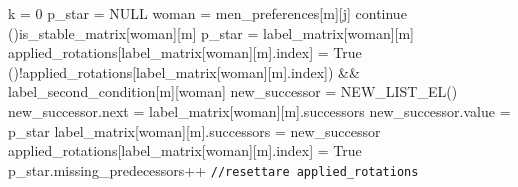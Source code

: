 \documentclass[12pt]{article}
\begin{document}
    \begin{algorithm}
        \scriptsize
        \DontPrintSemicolon
         {
		k = 0\;
            p\_star = NULL\;
		 {
			woman = men\_preferences[m][j]\:
			 {
                    continue\;
                }
			\If (){is\_stable\_matrix[woman][m]}{
                    p\_star = label\_matrix[woman][m]\;
                    applied\_rotations[label\_matrix[woman][m].index] = True\;
			} \ElseIf (){!applied\_rotations[label\_matrix[woman][m].index]) \&\& label\_second\_condition[m][woman]} {
                    new\_successor = NEW\_LIST\_EL()\;
                    new\_successor.next = label\_matrix[woman][m].successors\;
                    new\_successor.value = p\_star\;
                    label\_matrix[woman][m].successors = new\_successor\;
                    applied\_rotations[label\_matrix[woman][m].index] = True\;
                    p\_star.missing\_predecessors++\;
			    }
            }
            \texttt{//resettare applied\_rotations}\;
        }
    \end{algorithm}
    
\end{document}

